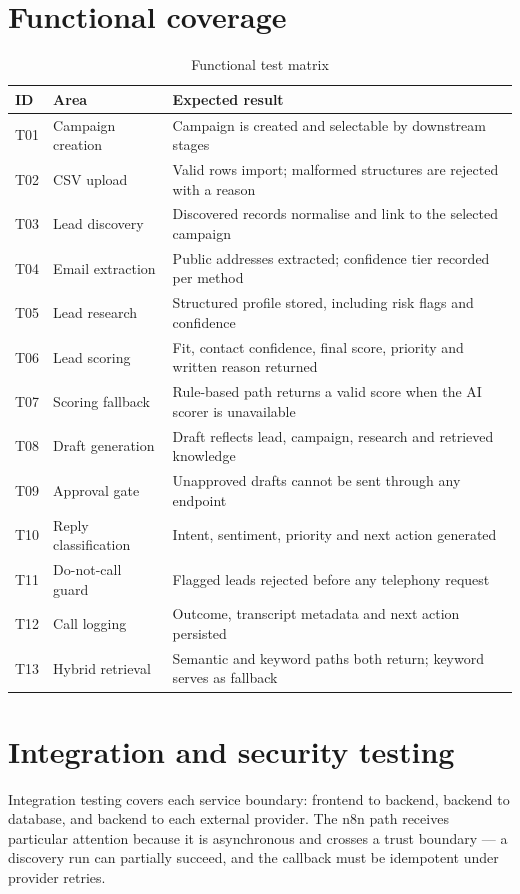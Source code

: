 \documentclass[11pt,a4paper]{report}
\begin{document}
\section{Functional coverage}
\begin{table}[H]
\centering
\caption{Functional test matrix}
\small
\begin{tabularx}{\textwidth}{p{0.9cm} p{4.0cm} X}
\toprule
ID & Area & Expected result \\
\midrule
T01 & Campaign creation & Campaign is created and selectable by downstream stages \\
T02 & CSV upload & Valid rows import; malformed structures are rejected with a reason \\
T03 & Lead discovery & Discovered records normalise and link to the selected campaign \\
T04 & Email extraction & Public addresses extracted; confidence tier recorded per method \\
T05 & Lead research & Structured profile stored, including risk flags and confidence \\
T06 & Lead scoring & Fit, contact confidence, final score, priority and written reason returned \\
T07 & Scoring fallback & Rule-based path returns a valid score when the AI scorer is unavailable \\
T08 & Draft generation & Draft reflects lead, campaign, research and retrieved knowledge \\
T09 & Approval gate & Unapproved drafts cannot be sent through any endpoint \\
T10 & Reply classification & Intent, sentiment, priority and next action generated \\
T11 & Do-not-call guard & Flagged leads rejected before any telephony request \\
T12 & Call logging & Outcome, transcript metadata and next action persisted \\
T13 & Hybrid retrieval & Semantic and keyword paths both return; keyword serves as fallback \\
\bottomrule
\end{tabularx}
\end{table}

\section{Integration and security testing}
Integration testing covers each service boundary: frontend to backend, backend to database, and backend to each external provider. The n8n path receives particular attention because it is asynchronous and crosses a trust boundary --- a discovery run can partially succeed, and the callback must be idempotent under provider retries.
\end{document}
